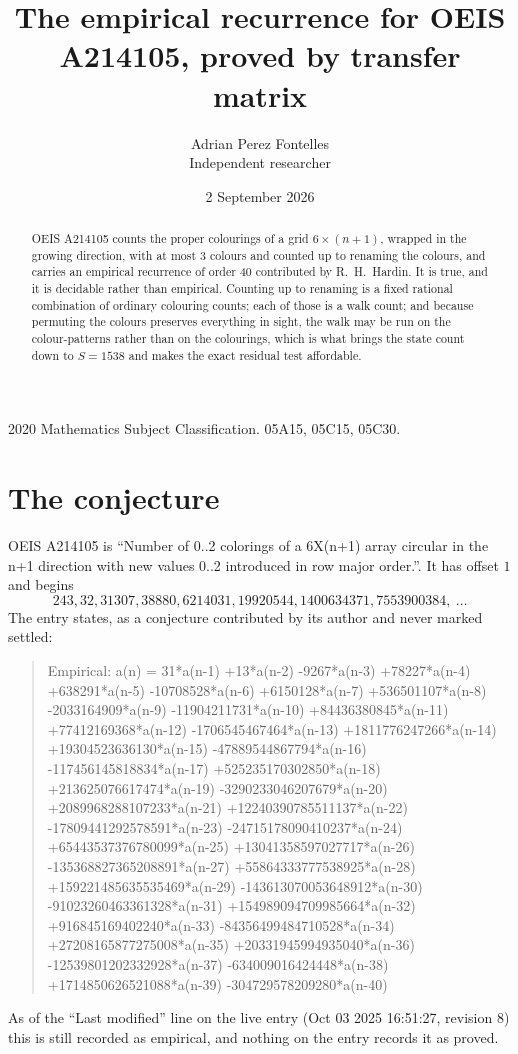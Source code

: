 \documentclass[11pt,a4paper]{article}
\title{The empirical recurrence for OEIS A214105, proved by transfer matrix}
\author{Adrian Perez Fontelles\\ \small Independent researcher}
\date{2 September 2026}
\theoremstyle{plain}
\theoremstyle{definition}
\begin{document}
\maketitle

\begin{abstract}
OEIS A214105 counts the proper colourings of a grid $6\times(n+1)$, wrapped in the growing direction, with at most $3$ colours and
counted up to renaming the colours, and carries an empirical recurrence of order $40$
contributed by R.~H.~Hardin. It is true, and it is decidable rather than empirical. Counting
up to renaming is a fixed rational combination of ordinary colouring counts; each of those is
a walk count; and because permuting the colours preserves everything in sight, the walk may be
run on the colour-patterns rather than on the colourings, which is what brings the state count
down to $S=1538$ and makes the exact residual test affordable.
\end{abstract}

\noindent\small 2020 Mathematics Subject Classification. 05A15, 05C15, 05C30.\normalsize

\section{The conjecture}

OEIS A214105 is ``Number of 0..2 colorings of a 6X(n+1) array circular in the n+1 direction with new values 0..2 introduced in row major order.''. It has offset $1$ and begins
\[
243, 32, 31307, 38880, 6214031, 19920544, 1400634371, 7553900384,\ \dots
\]
The entry states, as a conjecture contributed by its author and never marked settled:
\begin{quote}
Empirical: a(n) = 31*a(n-1) +13*a(n-2) -9267*a(n-3) +78227*a(n-4) +638291*a(n-5) -10708528*a(n-6) +6150128*a(n-7) +536501107*a(n-8) -2033164909*a(n-9) -11904211731*a(n-10) +84436380845*a(n-11) +77412169368*a(n-12) -1706545467464*a(n-13) +1811776247266*a(n-14) +19304523636130*a(n-15) -47889544867794*a(n-16) -117456145818834*a(n-17) +525235170302850*a(n-18) +213625076617474*a(n-19) -3290233046207679*a(n-20) +2089968288107233*a(n-21) +12240390785511137*a(n-22) -17809441292578591*a(n-23) -24715178090410237*a(n-24) +65443537376780099*a(n-25) +13041358597027717*a(n-26) -135368827365208891*a(n-27) +55864333777538925*a(n-28) +159221485635535469*a(n-29) -143613070053648912*a(n-30) -91023260463361328*a(n-31) +154989094709985664*a(n-32) +916845169402240*a(n-33) -84356499484710528*a(n-34) +27208165877275008*a(n-35) +20331945994935040*a(n-36) -12539801202332928*a(n-37) -634009016424448*a(n-38) +1714850626521088*a(n-39) -304729578209280*a(n-40)
\end{quote}
As of the ``Last modified'' line on the live entry (Oct 03 2025 16:51:27, revision 8) this is still
recorded as empirical, and nothing on the entry records it as proved.
\end{document}
